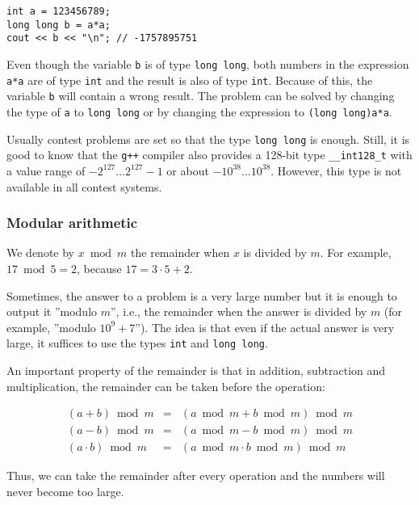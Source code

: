 \begin{lstlisting}
int a = 123456789;
long long b = a*a;
cout << b << "\n"; // -1757895751
\end{lstlisting}

Even though the variable \texttt{b} is of type \texttt{long long},
both numbers in the expression \texttt{a*a}
are of type \texttt{int} and the result is
also of type \texttt{int}.
Because of this, the variable \texttt{b} will
contain a wrong result.
The problem can be solved by changing the type
of \texttt{a} to \texttt{long long} or
by changing the expression to \texttt{(long long)a*a}.

Usually contest problems are set so that the
type \texttt{long long} is enough.
Still, it is good to know that
the \texttt{g++} compiler also provides
a 128-bit type \texttt{\_\_int128\_t}
with a value range of
$-2^{127} \ldots 2^{127}-1$ or about $-10^{38} \ldots 10^{38}$.
However, this type is not available in all contest systems.

\subsubsection{Modular arithmetic}


We denote by $x \bmod m$ the remainder
when $x$ is divided by $m$.
For example, $17 \bmod 5 = 2$,
because $17 = 3 \cdot 5 + 2$.

Sometimes, the answer to a problem is a
very large number but it is enough to
output it ''modulo $m$'', i.e.,
the remainder when the answer is divided by $m$
(for example, ''modulo $10^9+7$'').
The idea is that even if the actual answer
is very large,
it suffices to use the types
\texttt{int} and \texttt{long long}.

An important property of the remainder is that
in addition, subtraction and multiplication,
the remainder can be taken before the operation:

\[
\begin{array}{rcr}
(a+b) \bmod m & = & (a \bmod m + b \bmod m) \bmod m \\
(a-b) \bmod m & = & (a \bmod m - b \bmod m) \bmod m \\
(a \cdot b) \bmod m & = & (a \bmod m \cdot b \bmod m) \bmod m
\end{array}
\]

Thus, we can take the remainder after every operation
and the numbers will never become too large.

